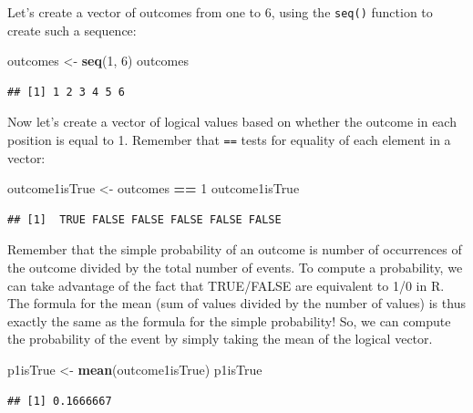 \documentclass[12pt,]{book}
\newenvironment{Shaded}{\begin{snugshade}}{\end{snugshade}}
\newcommand{\DecValTok}[1]{\textcolor[rgb]{0.00,0.00,0.81}{#1}}
\newcommand{\KeywordTok}[1]{\textcolor[rgb]{0.13,0.29,0.53}{\textbf{#1}}}
\newcommand{\NormalTok}[1]{#1}
\newcommand{\OperatorTok}[1]{\textcolor[rgb]{0.81,0.36,0.00}{\textbf{#1}}}
\newcommand{\StringTok}[1]{\textcolor[rgb]{0.31,0.60,0.02}{#1}}
\begin{document}
Let's create a vector of outcomes from one to 6, using the \texttt{seq()} function to create such a sequence:

\begin{Shaded}
\begin{Highlighting}[]
\NormalTok{outcomes <-}\StringTok{ }\KeywordTok{seq}\NormalTok{(}\DecValTok{1}\NormalTok{, }\DecValTok{6}\NormalTok{)}
\NormalTok{outcomes}
\end{Highlighting}
\end{Shaded}

\begin{verbatim}
## [1] 1 2 3 4 5 6
\end{verbatim}

Now let's create a vector of logical values based on whether the outcome in each position is equal to 1. Remember that \texttt{==} tests for equality of each element in a vector:

\begin{Shaded}
\begin{Highlighting}[]
\NormalTok{outcome1isTrue <-}\StringTok{ }\NormalTok{outcomes }\OperatorTok{==}\StringTok{ }\DecValTok{1} 
\NormalTok{outcome1isTrue}
\end{Highlighting}
\end{Shaded}

\begin{verbatim}
## [1]  TRUE FALSE FALSE FALSE FALSE FALSE
\end{verbatim}

Remember that the simple probability of an outcome is number of occurrences of the outcome divided by the total number of events. To compute a probability, we can take advantage of the fact that TRUE/FALSE are equivalent to 1/0 in R. The formula for the mean (sum of values divided by the number of values) is thus exactly the same as the formula for the simple probability! So, we can compute the probability of the event by simply taking the mean of the logical vector.

\begin{Shaded}
\begin{Highlighting}[]
\NormalTok{p1isTrue <-}\StringTok{ }\KeywordTok{mean}\NormalTok{(outcome1isTrue)}
\NormalTok{p1isTrue}
\end{Highlighting}
\end{Shaded}

\begin{verbatim}
## [1] 0.1666667
\end{verbatim}
\end{document}
